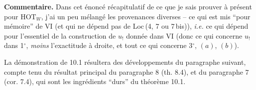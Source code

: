 \documentclass[11pt]{article}
\newcommand{\msp}[1]{\marginpar{\footnotesize [#1]}}
\newcommand{\HOT}{\mathrm{HOT}}
\begin{document}
\msp{page 137}

\textbf{Commentaire.} Dans cet énoncé récapitulatif de ce que je sais prouver à présent pour $\HOT_W$, j'ai un peu mélangé les provenances diverses – ce qui est mis “pour mémoire” de VI (et qui ne dépend pas de Loc\,(4, 7 ou 7\,bis)), \textit{i.e.} ce qui dépend pour l'essentiel de la construction de $u_!$ donnée dans VI (donc ce qui concerne $u_!$ dans 1$^{\circ}$, \textit{moins} l'exactitude à droite, et tout ce qui concerne 3$^{\circ}$, $(a)$, $(b)$).

La démonstration de 10.1 résultera des développements du paragraphe suivant, compte tenu du résultat principal du paragraphe 8 (th. 8.4), et du paragraphe 7 (cor. 7.4), qui sont les ingrédients “durs” du théorème 10.1.
\end{document}
